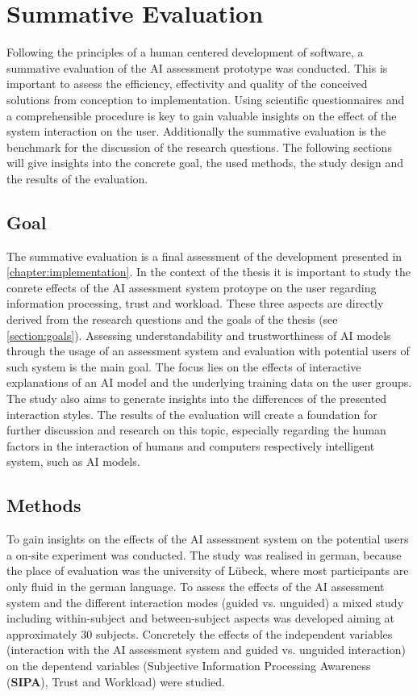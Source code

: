 \documentclass[11pt,a4paper,english]{scrreprt}
\begin{document}
\newpage
\chapter{Summative Evaluation}\label{chapter:evaluation}
Following the principles of a human centered development of software, a summative evaluation of the AI assessment prototype was conducted. This is important to assess the efficiency, effectivity and quality of the conceived solutions from conception to implementation. Using scientific questionnaires and a comprehensible procedure is key to gain valuable insights on the effect of the system interaction on the user. Additionally the summative evaluation is the benchmark for the discussion of the research questions. The following sections will give insights into the concrete goal, the used methods, the study design and the results of the evaluation.

\section{Goal}
The summative evaluation is a final assessment of the development presented in \autoref{chapter:implementation}. In the context of the thesis it is important to study the conrete effects of the AI assessment system protoype on the user regarding information processing, trust and workload. These three aspects are directly derived from the research questions and the goals of the thesis (see \autoref{section:goals}). Assessing understandability and trustworthiness of AI models through the usage of an assessment system and evaluation with potential users of such system is the main goal. The focus lies on the effects of interactive explanations of an AI model and the underlying training data on the user groups. The study also aims to generate insights into the differences of the presented interaction styles. The results of the evaluation will create a foundation for further discussion and research on this topic, especially regarding the human factors in the interaction of humans and computers respectively intelligent system, such as AI models.

\section{Methods}
To gain insights on the effects of the AI assessment system on the potential users a on-site experiment was conducted. The study was realised in german, because the place of evaluation was the university of Lübeck, where most participants are only fluid in the german language. To assess the effects of the AI assessment system and the different interaction modes (guided vs. unguided) a mixed study including within-subject and between-subject aspects was developed aiming at approximately 30 subjects. Concretely the effects of the independent variables (interaction with the AI assessment system and guided vs. unguided interaction) on the depentend variables (Subjective Information Processing Awareness (\textbf{SIPA}), Trust and Workload) were studied.
\end{document}
